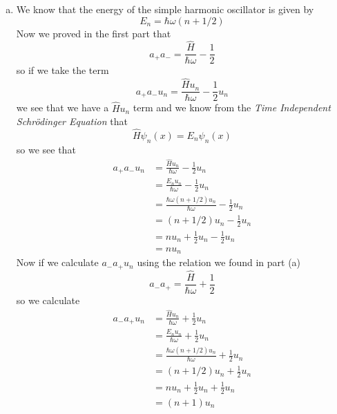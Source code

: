 \documentclass[11pt]{article}
\numberwithin{equation}{section}
\begin{document}
\begin{enumerate}[(a)]
\item
We know that the energy of the simple harmonic oscillator is given by
\begin{equation}
E_n = \hbar\omega(n+1/2)
\label{energy}
\end{equation}
Now we proved in the first part that
$$a_+a_- = \frac{\hat{H}}{\hbar\omega}-\frac{1}{2}$$
so if we take the term
$$a_+a_-u_n = \frac{\hat{H}u_n}{\hbar\omega}-\frac{1}{2}u_n$$
we see that we have a $\hat{H}u_n$ term and we know from the \emph{Time Independent Schr\"{o}dinger Equation} that
$$\hat{H}\psi_n(x) = E_n\psi_n(x)$$
so we see that 
\begin{align*}
a_+a_-u_n &= \frac{\hat{H}u_n}{\hbar\omega}-\frac{1}{2}u_n\\
&= \frac{E_nu_n}{\hbar\omega}-\frac{1}{2}u_n\\
&= \frac{\hbar\omega(n+1/2)u_n}{\hbar\omega}-\frac{1}{2}u_n\\
&= (n+1/2)u_n-\frac{1}{2}u_n\\
&= nu_n+\frac{1}{2}u_n-\frac{1}{2}u_n\\
&= nu_n
\end{align*}
Now if we calculate $a_-a_+u_n$ using the relation we found in part (a) 
$$a_-a_+ = \frac{\hat{H}}{\hbar\omega}+\frac{1}{2}$$
so we calculate 
\begin{align*}
a_-a_+u_n &= \frac{\hat{H}u_n}{\hbar\omega}+\frac{1}{2}u_n\\
&= \frac{E_nu_n}{\hbar\omega}+\frac{1}{2}u_n\\
&= \frac{\hbar\omega(n+1/2)u_n}{\hbar\omega}+\frac{1}{2}u_n\\
&= (n+1/2)u_n+\frac{1}{2}u_n\\
&= nu_n+\frac{1}{2}u_n+\frac{1}{2}u_n\\
&= (n+1)u_n
\end{align*}


\end{enumerate}
\end{document}
